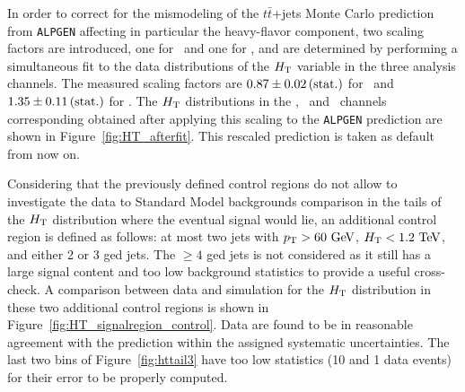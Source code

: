 In order to correct for the mismodeling of the $t\bar{t}$+jets 
Monte Carlo prediction from \texttt{ALPGEN} affecting in
particular the heavy-flavor component, two scaling factors are
introduced, one for \ttlf\ and one for \tthf, and are determined
by performing a simultaneous fit to the data distributions
of the $\HT$  variable in the three analysis channels. 
The measured scaling factors are 
$0.87 \pm 0.02\,{\rm (stat.)}$ for \ttlf\ and 
$1.35 \pm 0.11\,{\rm (stat.)}$ for \tthf.
The $\HT$ distributions in the \chii, \chiii\ and \chiv\ 
channels corresponding obtained after applying this scaling
to the \texttt{ALPGEN} prediction are shown in Figure~\ref{fig:HT_afterfit}.
This rescaled prediction is taken as default from now on.


Considering that the previously defined control regions do not allow
to investigate the data to Standard Model backgrounds comparison in
the tails of the $\HT$ distribution where the eventual signal would lie,
an additional control region is defined as follows: 
at most two jets with $\pt>60\gev$, $\HT<1.2\tev$, and either 2 or 3 \btag ged jets.
The  $\geq 4$ \btag ged jets is not considered as it still has 
a large signal content and too low background statistics to provide
a useful cross-check.
A comparison between data and simulation for the $\HT$ distribution 
in these two additional control regions is shown in 
Figure~\ref{fig:HT_signalregion_control}.
Data are found to be in reasonable agreement with the 
prediction within the assigned systematic uncertainties. 
The last two bins of Figure~\ref{fig:httail3} have too low
statistics (10 and 1 data events) for their error to be properly computed.

